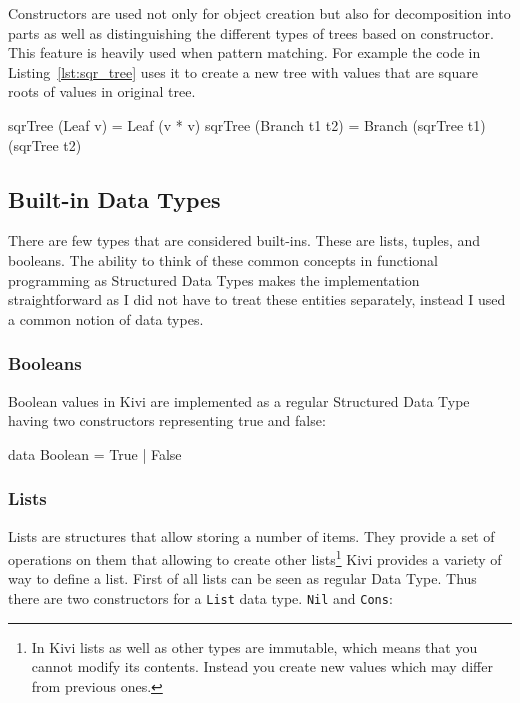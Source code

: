 \documentclass[12pt,a4paper]{report}
\begin{document}
Constructors are used not only for object creation but also for decomposition
into parts as well as distinguishing the different types of trees based on
constructor. This feature is heavily used when pattern matching. For example
the code in Listing~\ref{lst:sqr_tree} uses it to create a new tree with values
that are square roots of values in original tree.

\vspace*{0.2in}
\begin{code}[label=lst:sqr_tree,caption={Creating a `square rooted` tree.}]
sqrTree (Leaf v) = Leaf (v * v)
sqrTree (Branch t1 t2) = Branch (sqrTree t1) (sqrTree t2)
\end{code}

\subsection{Built-in Data Types}
There are few types that are considered built-ins. These are lists, tuples,
and booleans. The ability to think of these common concepts in functional
programming as Structured Data Types makes the implementation straightforward
as I did not have to treat these entities separately, instead I used a common
notion of data types.
\subsubsection{Booleans}
Boolean values in Kivi are implemented as a regular Structured Data Type having
two constructors representing true and false:

\vspace*{0.2in}
\begin{code}[style=haskell]
data Boolean = True | False
\end{code}

\subsubsection{Lists}
Lists are structures that allow storing a number of items. They
provide a set of operations on them that allowing to create other
lists\footnote{In Kivi lists as well as other types are immutable, which means
that you cannot modify its contents. Instead you create new values which may
differ from previous ones. }
Kivi provides a variety of way to define a list. First of all lists can be seen
as regular Data Type. Thus there are two constructors for a \texttt{List}
data type. \texttt{Nil} and \texttt{Cons}:
\end{document}
